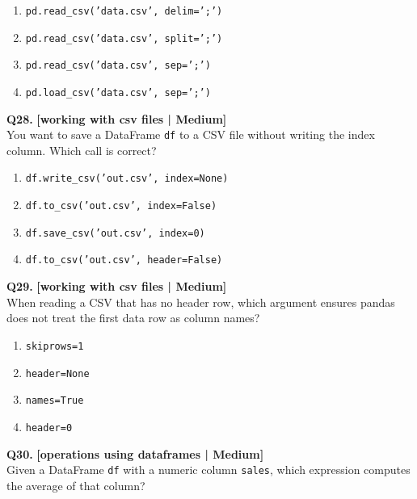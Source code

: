 \begin{enumerate}[label=(\alph*),topsep=2pt,itemsep=1pt,partopsep=0pt,parsep=0pt]
    \item \relax \texttt{pd.read\_csv('data.csv', delim=';')}
    \item \relax \texttt{pd.read\_csv('data.csv', split=';')}
    \item \relax \texttt{pd.read\_csv('data.csv', sep=';')}
    \item \relax \texttt{pd.load\_csv('data.csv', sep=';')}
\end{enumerate}
\vspace{2mm}

\noindent\textbf{Q28.} \hfill {\small\color{LPUOrange}\textbf{[working with csv files | Medium]}}\\[2pt]
You want to save a DataFrame \texttt{df} to a CSV file without writing the index column. Which call is correct?

\begin{enumerate}[label=(\alph*),topsep=2pt,itemsep=1pt,partopsep=0pt,parsep=0pt]
    \item \relax \texttt{df.write\_csv('out.csv', index=None)}
    \item \relax \texttt{df.to\_csv('out.csv', index=False)}
    \item \relax \texttt{df.save\_csv('out.csv', index=0)}
    \item \relax \texttt{df.to\_csv('out.csv', header=False)}
\end{enumerate}
\vspace{2mm}

\noindent\textbf{Q29.} \hfill {\small\color{LPUOrange}\textbf{[working with csv files | Medium]}}\\[2pt]
When reading a CSV that has no header row, which argument ensures pandas does not treat the first data row as column names?

\begin{enumerate}[label=(\alph*),topsep=2pt,itemsep=1pt,partopsep=0pt,parsep=0pt]
    \item \relax \texttt{skiprows=1}
    \item \relax \texttt{header=None}
    \item \relax \texttt{names=True}
    \item \relax \texttt{header=0}
\end{enumerate}
\vspace{2mm}

\noindent\textbf{Q30.} \hfill {\small\color{LPUOrange}\textbf{[operations using dataframes | Medium]}}\\[2pt]
Given a DataFrame \texttt{df} with a numeric column \texttt{sales}, which expression computes the average of that column?

